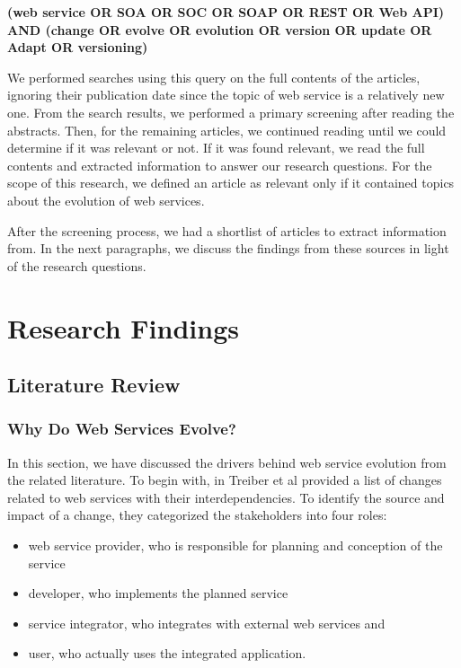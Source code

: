 \documentclass[runningheads,a4paper]{llncs}
\begin{document}
\textbf{(web service OR SOA OR SOC OR SOAP OR REST OR Web API)  AND (change OR evolve OR evolution OR version OR update OR Adapt OR versioning)}

We performed searches using this query on the full contents of the articles, ignoring their publication date since the topic of web service is a relatively new one. From the search results, we performed a primary screening after reading the abstracts. Then, for the remaining articles, we continued reading until we could determine if it was relevant or not. If it was found relevant, we read the full contents and extracted information to answer our research questions. For the scope of this research, we defined an article as relevant only if it contained topics about the evolution of web services.

After the screening process, we had a shortlist of articles to extract information from. In the next paragraphs, we discuss the findings from these sources in light of the research questions.


\section{Research Findings} %
\label{sec:research_findings}

\subsection{Literature Review} %
\label{sub:literature_review}

\subsubsection{Why Do Web Services Evolve?} %
\label{sub:why_do_web_services_change}
In this section, we have discussed the drivers behind web service evolution from the related literature. To begin with, in \cite{treiber2009analyzing} Treiber et al provided a list of changes related to web services with their interdependencies. To identify the source and impact of a change, they categorized the stakeholders into four roles:

\begin{itemize}
  \item web service provider, who is responsible for planning and conception of the service
  \item developer, who implements the planned service
  \item service integrator, who integrates with external web services and
  \item user, who actually uses the integrated application.
\end{itemize}
\end{document}
